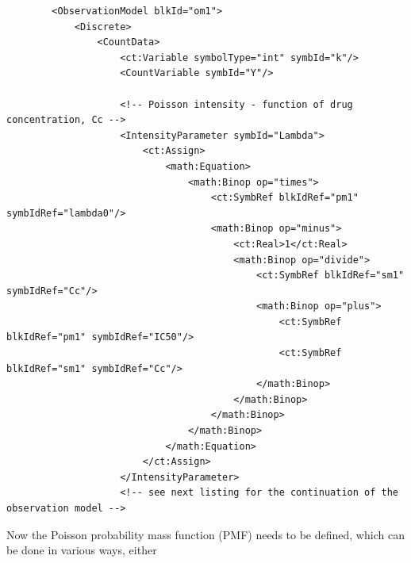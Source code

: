 \lstset{language=XML}
\begin{lstlisting}
        <ObservationModel blkId="om1">
            <Discrete>
                <CountData>
                    <ct:Variable symbolType="int" symbId="k"/>
                    <CountVariable symbId="Y"/>
                    
                    <!-- Poisson intensity - function of drug concentration, Cc -->                    
                    <IntensityParameter symbId="Lambda">
                        <ct:Assign>
                            <math:Equation>
                                <math:Binop op="times">
                                    <ct:SymbRef blkIdRef="pm1" symbIdRef="lambda0"/>
                                    <math:Binop op="minus">
                                        <ct:Real>1</ct:Real>
                                        <math:Binop op="divide">
                                            <ct:SymbRef blkIdRef="sm1" symbIdRef="Cc"/>
                                            <math:Binop op="plus">
                                                <ct:SymbRef blkIdRef="pm1" symbIdRef="IC50"/>
                                                <ct:SymbRef blkIdRef="sm1" symbIdRef="Cc"/>
                                            </math:Binop>
                                        </math:Binop>
                                    </math:Binop>
                                </math:Binop>
                            </math:Equation>
                        </ct:Assign>
                    </IntensityParameter>
                    <!-- see next listing for the continuation of the observation model -->
\end{lstlisting}
Now the Poisson probability mass function (PMF) needs to be defined, which can be done
in various ways, either
